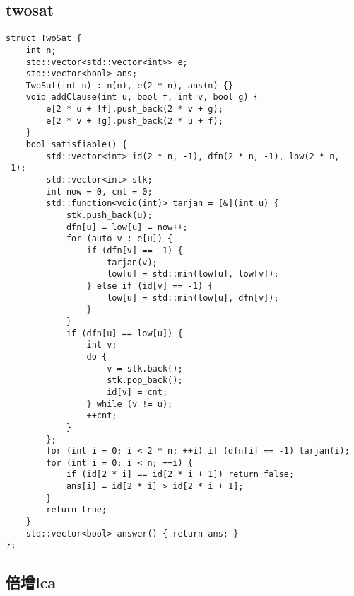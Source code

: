 \documentclass[a4paper,10pt]{article}
\begin{document}
\subsection{twosat}
\thispagestyle{fancy}

\noindent\begin{lstlisting}
struct TwoSat {
    int n;
    std::vector<std::vector<int>> e;
    std::vector<bool> ans;
    TwoSat(int n) : n(n), e(2 * n), ans(n) {}
    void addClause(int u, bool f, int v, bool g) {
        e[2 * u + !f].push_back(2 * v + g);
        e[2 * v + !g].push_back(2 * u + f);
    }
    bool satisfiable() {
        std::vector<int> id(2 * n, -1), dfn(2 * n, -1), low(2 * n, -1);
        std::vector<int> stk;
        int now = 0, cnt = 0;
        std::function<void(int)> tarjan = [&](int u) {
            stk.push_back(u);
            dfn[u] = low[u] = now++;
            for (auto v : e[u]) {
                if (dfn[v] == -1) {
                    tarjan(v);
                    low[u] = std::min(low[u], low[v]);
                } else if (id[v] == -1) {
                    low[u] = std::min(low[u], dfn[v]);
                }
            }
            if (dfn[u] == low[u]) {
                int v;
                do {
                    v = stk.back();
                    stk.pop_back();
                    id[v] = cnt;
                } while (v != u);
                ++cnt;
            }
        };
        for (int i = 0; i < 2 * n; ++i) if (dfn[i] == -1) tarjan(i);
        for (int i = 0; i < n; ++i) {
            if (id[2 * i] == id[2 * i + 1]) return false;
            ans[i] = id[2 * i] > id[2 * i + 1];
        }
        return true;
    }
    std::vector<bool> answer() { return ans; }
};
 \end{lstlisting}

\subsection{倍增lca}
\thispagestyle{fancy}
\end{document}
